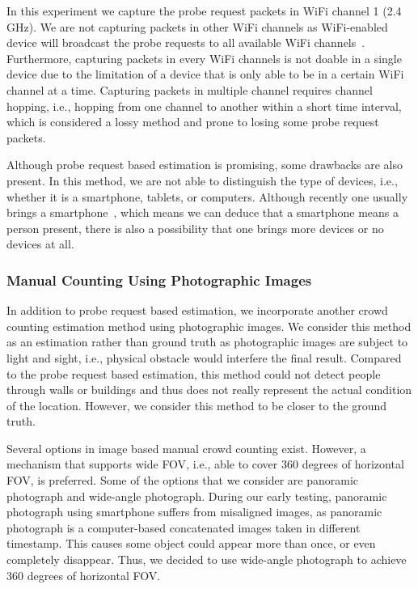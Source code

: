 	In this experiment we capture the probe request packets in WiFi channel 1 (2.4 GHz). We are not capturing packets in other WiFi channels as WiFi-enabled device will broadcast the probe requests to all available WiFi channels~\cite{thesis082}. Furthermore, capturing packets in every WiFi channels is not doable in a single device due to the limitation of a device that is only able to be in a certain WiFi channel at a time. Capturing packets in multiple channel requires channel hopping, i.e., hopping from one channel to another within a short time interval, which is considered a lossy method and prone to losing some probe request packets.

	Although probe request based estimation is promising, some drawbacks are also present. In this method, we are not able to distinguish the type of devices, i.e., whether it is a smartphone, tablets, or computers. Although recently one usually brings a smartphone~\cite{thesis047}, which means we can deduce that a smartphone means a person present, there is also a possibility that one brings more devices or no devices at all.

	\subsubsection{Manual Counting Using Photographic Images} %
	\label{ssub:manual_counting_using_photo}
	In addition to probe request based estimation, we incorporate another crowd counting estimation method using photographic images. We consider this method as an estimation rather than ground truth as photographic images are subject to light and sight, i.e., physical obstacle would interfere the final result. Compared to the probe request based estimation, this method could not detect people through walls or buildings and thus does not really represent the actual condition of the location. However, we consider this method to be closer to the ground truth.
	
	Several options in image based manual crowd counting exist. However, a mechanism that supports wide \ac{FOV}, i.e., able to cover 360 degrees of horizontal \ac{FOV}, is preferred. Some of the options that we consider are panoramic photograph and wide-angle photograph. During our early testing, panoramic photograph using smartphone suffers from misaligned images, as panoramic photograph is a computer-based concatenated images taken in different timestamp. This causes some object could appear more than once, or even completely disappear. Thus, we decided to use wide-angle photograph to achieve 360 degrees of horizontal \ac{FOV}.

